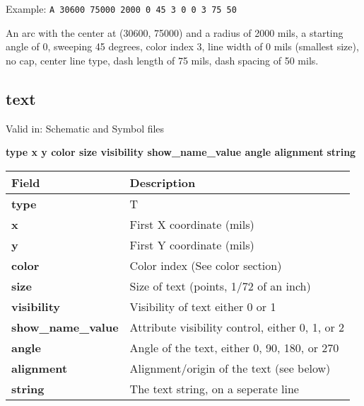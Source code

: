 \documentclass{article}
\begin{document}
Example:\newline
{\tt A 30600 75000 2000 0 45 3 0 0 3 75 50}

An arc with the center at (30600, 75000) and a radius of 2000 mils, a 
starting angle of 0, sweeping 45 degrees, color index 3, line width of 0 mils 
(smallest size), no cap, center line type, dash length of 75 mils, dash 
spacing of 50 mils.


\subsection{text}

Valid in: Schematic and Symbol files

{\bf type x y color size visibility show\_name\_value angle alignment}\newline
{\bf string}

\begin{table}[h]
\begin{tabular}{|l|l|} \hline
Field & Description \\ \hline \hline
{\bf type} & T \\ \hline
{\bf x} & First X coordinate (mils) \\ \hline
{\bf y} & First Y coordinate (mils) \\ \hline
{\bf color} & Color index (See color section) \\ \hline
{\bf size} & Size of text (points, 1/72 of an inch) \\ \hline
{\bf visibility} & Visibility of text either 0 or 1 \\ \hline
{\bf show\_name\_value} & Attribute visibility control, either 0, 1, or 2 \\ \hline
{\bf angle} & Angle of the text, either 0, 90, 180, or 270 \\ \hline
{\bf alignment} & Alignment/origin of the text (see below) \\ \hline
{\bf string} & The text string, on a seperate line \\ \hline
\end{tabular}
\end{table}
\end{document}
